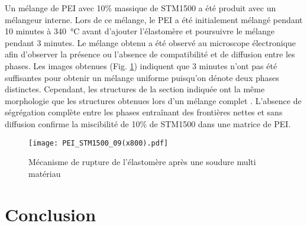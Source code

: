 Un mélange de PEI avec 10\% massique de STM1500 a été produit avec un mélangeur interne. 
Lors de ce mélange, le PEI a été initialement mélangé pendant 10 minutes à \SI{340}{\celsius} avant d'ajouter l'élastomère et poursuivre le mélange pendant 3 minutes. 
Le mélange obtenu a été observé au microscope électronique afin d'observer la présence ou l'absence de compatibilité et de diffusion entre les phases. 
Les images obtenues (Fig. \ref{fig:SEM_mix_STM1500_PEI}) indiquent que 3 minutes n'ont pas été suffisantes pour obtenir un mélange uniforme puisqu'on dénote deux phases distinctes. 
Cependant, les structures de la section indiquée ont la même morphologie que les structures obtenues lors d'un mélange complet \cite{Hatui2015}. 
L'absence de ségrégation complète entre les phases entraînant des frontières nettes et sans diffusion confirme la miscibilité de 10\% de STM1500 dans une matrice de PEI. 

\begin{figure}[h]
	\centering
	\texttt{[image: PEI\_STM1500\_09(x800).pdf]}
	\caption{Mécanisme de rupture de l'élastomère après une soudure multi matériau}
	\label{fig:SEM_mix_STM1500_PEI}
\end{figure}

\FloatBarrier
\section{Conclusion}


